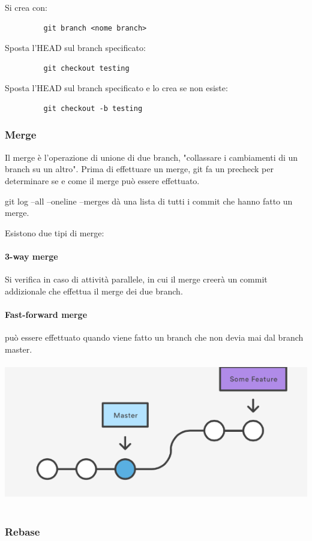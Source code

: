 \documentclass[10pt,a4paper]{book}
\begin{document}
Si crea con: \begin{verbatim}         git branch <nome branch> \end{verbatim}
Sposta l'HEAD sul branch specificato: \begin{verbatim}         git checkout testing\end{verbatim}
Sposta l'HEAD sul branch specificato e lo crea se non esiste:\begin{verbatim}         git checkout -b testing\end{verbatim}


\subsubsection{Merge}
Il merge è l'operazione di unione di due branch, "collassare i cambiamenti di un branch su un altro".
Prima di effettuare un merge, git fa un precheck per determinare se e come il merge può essere effettuato.

git log --all --oneline --merges dà una lista di tutti i commit che hanno fatto un merge.

Esistono due tipi di merge:
\paragraph{3-way merge}
Si verifica in caso di attività parallele, in cui il merge creerà un commit addizionale che effettua il merge dei due branch.
\paragraph{Fast-forward merge}
può essere effettuato quando viene fatto un branch che non devia mai dal branch master.\\ \\
\includegraphics[scale=0.4]{mergeff.png} \\ \\

\subsubsection{Rebase}
\end{document}
